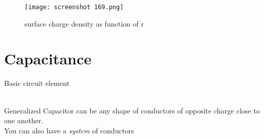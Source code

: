 \documentclass[svgnames]{article}   	%
\begin{document}
\begin{figure}[H]
  \centering
    \texttt{[image: screenshot 169.png]}
    \caption{surface charge density as function of r}
\end{figure}


\section{Capacitance} 

Basic circuit element \mbox{} \\



\\

Generalized Capacitor can be any shape of conductors of opposite charge close
to one another. \mbox{} \\

You can also have a \textit{system} of conductors 
\end{document}
